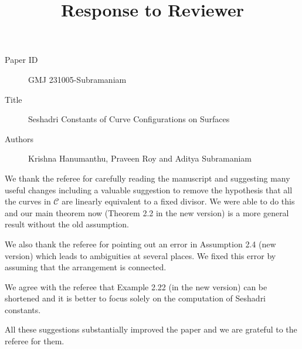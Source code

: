 \documentclass[12pt,twoside,reqno]{amsart}
\numberwithin{equation}{section}
\theoremstyle{definition}
\begin{document}
\title{Response to Reviewer}
\begin{description}
\item[Paper ID]  GMJ 231005-Subramaniam

\item [Title] Seshadri Constants of Curve Configurations on Surfaces
\item [Authors] Krishna Hanumanthu, Praveen Roy and Aditya Subramaniam
\end{description}

We thank the referee for carefully reading the manuscript and suggesting 
many useful changes including a valuable suggestion to remove the hypothesis that all the curves in $\mathcal{C}$ are linearly equivalent to a fixed divisor. We were able to do this and our main theorem now (Theorem 2.2 in the new version) is a more general result without the old assumption. 

We also thank the referee for pointing out an error in  Assumption 2.4 (new version) which leads to 
ambiguities at several places. We fixed this error by assuming that the arrangement is connected. 

We  agree with the referee that Example 2.22 (in the new version)  can be shortened and it is better to  
focus solely on the computation of Seshadri constants. 

All these suggestions substantially improved the paper and we are grateful to the referee for them. 
\end{document}
